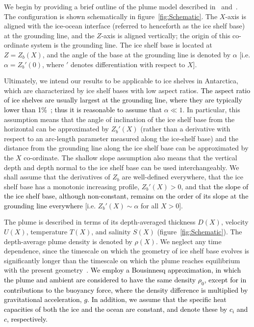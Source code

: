\documentclass[openacc]{rsproca_new}%
\newcommand{\red}[1]{{\color{red} #1}}
\newcommand{\blue}[1]{{\color{blue} #1}}
\newcommand{\rout}[1]{\red{\st{#1}}}\newcommand{\ab}[1]{\textcolor{Green}{#1}}\newcommand{\about}[1]{\textcolor{Cyan}{\sout{#1}}}
\renewcommand{\rout}[1]{{}} %
\renewcommand{\blue}[1]{{\textcolor{black}{#1}}} %
\renewcommand{\red}[1]{{}} %
\begin{document}
We begin by providing a brief outline of the plume model described in~\cite{Jenkins1991JGeophysResOceans} and~\cite{Jenkins2011JPhysOcean}. The configuration is shown schematically in figure~\ref{fig:Schematic}. The $X$-axis is aligned with the ice-ocean interface (referred to henceforth as the ice shelf base) at the grounding line, and the $Z$-axis is aligned vertically; the origin of this co-ordinate system is the grounding line. The ice shelf base is located at $Z = Z_b(X)$, and the angle of the base at the grounding line is denoted by $\alpha$ [i.e. $\alpha = Z_b'(0)$, where $'$ denotes differentiation with respect to $X$].

Ultimately, we intend our results to  be applicable to ice shelves in Antarctica, which are characterized by ice shelf bases with low aspect ratios. \blue{The aspect ratio of ice shelves are usually largest at the grounding line, where they are typically lower than 1\%~\cite{Rignot2011GRL}; thus it is reasonable to assume that} $\alpha \ll 1$. In particular, this assumption means that the angle of inclination of the ice shelf base from the horizontal can be approximated by $Z_b'(X)$ (rather than a derivative with respect to an arc-length parameter measured along the ice-shelf base) and the distance from the grounding line along the ice shelf base can be approximated by the $X$ co-ordinate. The shallow slope assumption also means that the vertical depth and depth normal to the ice shelf base can be used interchangeably. We shall assume that the derivatives of $Z_b$ are well-defined everywhere, that the ice shelf base has a monotonic increasing profile, $Z_b'(X) >0$, and that \blue{the slope of the ice shelf base, although non-constant, remains on the order of its slope at the grounding line everywhere} \rout{$\alpha$ is a characteristic slope throughout} [i.e. $Z_b'(X)\sim \alpha$ for all $X >0$]. 

The plume is described in terms of its depth-averaged thickness $D(X)$, velocity $U(X)$, temperature $T(X)$, and salinity $S(X)$ (figure~\ref{fig:Schematic}). The depth-average plume density is denoted by $\rho(X)$. We neglect any time dependence, since the timescale on which the geometry of ice shelf base evolves is significantly longer than the timescale on which the plume reaches equilibrium with the present geometry~\cite{Hewitt2020AnnRevFlu}. \blue{We employ a Bousinnesq approximation, in which the plume and ambient are considered to have the same density $\rho_0$, except for in contributions to the buoyancy force, where the density difference is multiplied by gravitational acceleration, $g$. In addition, we assume that the specific heat capacities of both the ice and the ocean are constant, and denote these by $c_i$ and $c$, respectively.}
\end{document}
